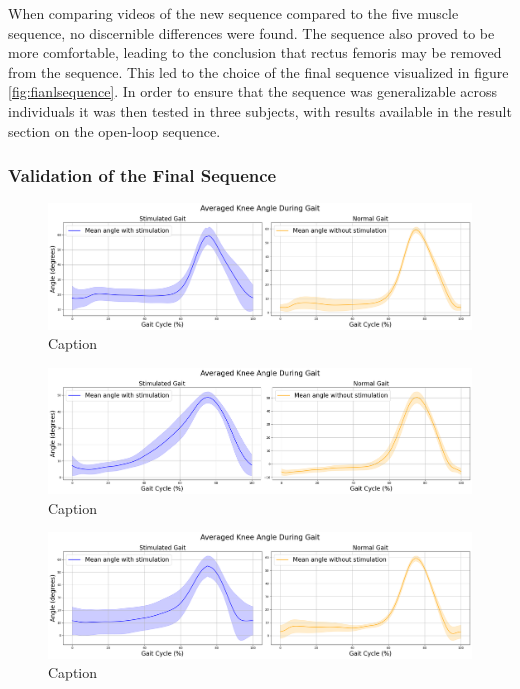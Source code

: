 When comparing videos of the new sequence compared to the five muscle sequence, no discernible differences were found. The sequence also proved to be more comfortable, leading to the conclusion that rectus femoris may be removed from the sequence. This led to the choice of the final sequence visualized in figure \ref{fig:fianlsequence}. In order to ensure that the sequence was generalizable across individuals it was then tested in three subjects, with results available in the result section on the open-loop sequence.

\subsubsection{Validation of the Final Sequence}
\begin{figure}[h]
    \centering
    \includegraphics[width=0.99\linewidth]{images/alexisoutput1.png}
    \caption{Caption}
    \label{fig:alexisout}
\end{figure}

\begin{figure}[h]
    \centering
    \includegraphics[width=0.99\linewidth]{images/katlaoutput1.png}
    \caption{Caption}
    \label{fig:katlaout}
\end{figure}

\begin{figure} [h]
    \centering
    \includegraphics[width=0.99\linewidth]{images/leonioutput1.png}
    \caption{Caption}
    \label{fig:leoniout}
\end{figure}

